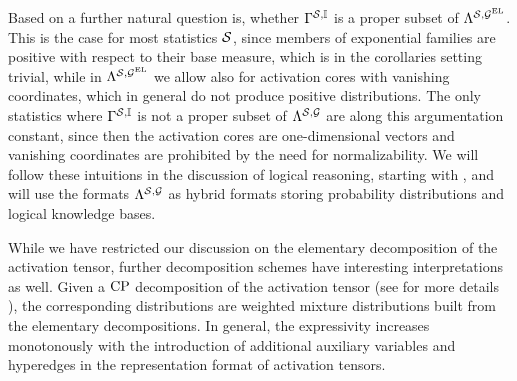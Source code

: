 Based on  a further natural question is, whether $\Gamma^{\mathcal{S},\mathbb{I}}$ is a proper subset of $\Lambda^{\mathcal{S},\mathcal{G}^{\mathrm{EL}}}$.
This is the case for most statistics $\mathcal{S}$, since members of exponential families are positive with respect to their base measure, which is in the corollaries setting trivial, while in $\Lambda^{\mathcal{S},\mathcal{G}^{\mathrm{EL}}}$ we allow also for activation cores with vanishing coordinates, which in general do not produce positive distributions.
The only statistics where $\Gamma^{\mathcal{S},\mathbb{I}}$ is not a proper subset of $\Lambda^{\mathcal{S},\mathcal{G}}$ are along this argumentation constant, since then the activation cores are one-dimensional vectors and vanishing coordinates are prohibited by the need for normalizability.
We will follow these intuitions in the discussion of logical reasoning, starting with , and will use the formats $\Lambda^{\mathcal{S},\mathcal{G}}$ as hybrid formats storing probability distributions and logical knowledge bases.

While we have restricted our discussion on the elementary decomposition of the activation tensor, further decomposition schemes have interesting interpretations as well.
Given a $\mathrm{CP}$ decomposition of the activation tensor (see for more details ), the corresponding distributions are weighted mixture distributions built from the elementary decompositions.
In general, the expressivity increases monotonously with the introduction of additional auxiliary variables and hyperedges in the representation format of activation tensors.


